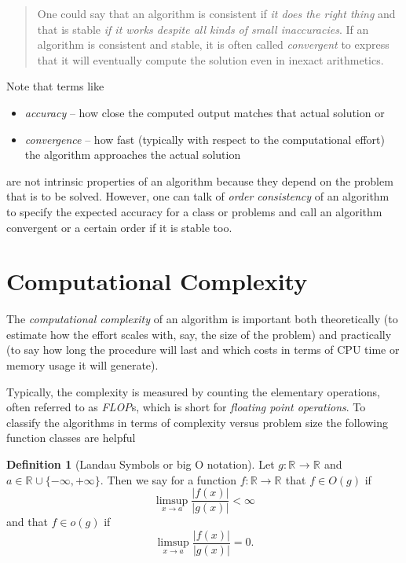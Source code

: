 \documentclass[
]{book}
\providecommand{\tightlist}{%
  \setlength{\itemsep}{0pt}\setlength{\parskip}{0pt}}
\newenvironment {JHSAYS} [0] {\begin{quote}\color{jhsc}} {\end{quote}}
\theoremstyle{definition}
\newtheorem{definition}{Definition}[chapter]
\theoremstyle{definition}
\theoremstyle{definition}
\theoremstyle{definition}
\theoremstyle{remark}
\begin{document}
\leavevmode\hypertarget{rem-coors}{}%
\begin{JHSAYS}
One could say that an algorithm is consistent if \emph{it does the right thing} and that is stable \emph{if it works despite all kinds of small inaccuracies}. If an algorithm is consistent and stable, it is often called \emph{convergent} to express that it will eventually compute the solution even in inexact arithmetics.

\end{JHSAYS}

Note that terms like

\begin{itemize}
\tightlist
\item
  \emph{accuracy} -- how close the computed output matches that actual solution or
\item
  \emph{convergence} -- how fast (typically with respect to the computational effort) the algorithm approaches the actual solution
\end{itemize}

are not intrinsic properties of an algorithm because they depend on the problem that is to be solved.
However, one can talk of \emph{order consistency} of an algorithm to specify the expected accuracy for a class or problems and call an algorithm convergent or a certain order if it is stable too.

\hypertarget{computational-complexity}{%
\section{Computational Complexity}\label{computational-complexity}}

The \emph{computational complexity} of an algorithm is important both theoretically (to estimate how the effort scales with, say, the size of the problem) and practically (to say how long the procedure will last and which costs in terms of CPU time or memory usage it will generate).

Typically, the complexity is measured by counting the elementary operations, often referred to as \emph{FLOP}s, which is short for \emph{floating point operations}.
To classify the algorithms in terms of complexity versus problem size the following function classes are helpful

\begin{definition}[Landau Symbols or big O notation]
\protect\hypertarget{def:landau-symbs}{}\label{def:landau-symbs}Let \(g\colon \mathbb R^{} \to \mathbb R^{}\) and \(a\in\mathbb R^{} \cup \{-\infty, +\infty\}\). Then we say for a function \(f\colon \mathbb R \to \mathbb R^{}\) that \(f\in O(g)\) if
\begin{equation*}
\limsup_{x\to a} \frac{|f(x)|}{|g(x)|} < \infty
\end{equation*}
and that \(f\in o(g)\) if
\begin{equation*}
\limsup_{x\to a} \frac{|f(x)|}{|g(x)|} = 0.
\end{equation*}
\end{definition}
\end{document}
